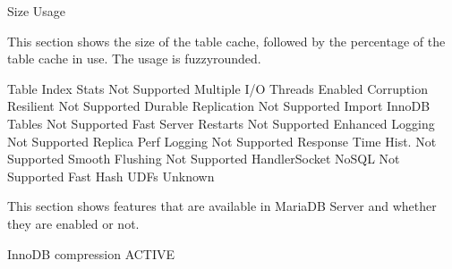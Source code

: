 \documentclass[letterpaper,10pt,english]{sphinxmanual}
\begin{document}
\begin{sphinxVerbatim}[commandchars=\\\{\}]
                     Size  
                    Usage  \PYGZpc{}
\end{sphinxVerbatim}

This section shows the size of the table cache, followed by the percentage of
the table cache in use. The usage is fuzzy\sphinxhyphen{}rounded.

\begin{sphinxVerbatim}[commandchars=\\\{\}]
      Table  Index Stats  Not Supported
     Multiple I/O Threads  Enabled
     Corruption Resilient  Not Supported
      Durable Replication  Not Supported
     Import InnoDB Tables  Not Supported
     Fast Server Restarts  Not Supported
         Enhanced Logging  Not Supported
     Replica Perf Logging  Not Supported
      Response Time Hist.  Not Supported
          Smooth Flushing  Not Supported
      HandlerSocket NoSQL  Not Supported
           Fast Hash UDFs  Unknown
\end{sphinxVerbatim}

This section shows features that are available in MariaDB Server and whether
they are enabled or not.

\begin{sphinxVerbatim}[commandchars=\\\{\}]
       InnoDB compression  ACTIVE
\end{sphinxVerbatim}
\end{document}
